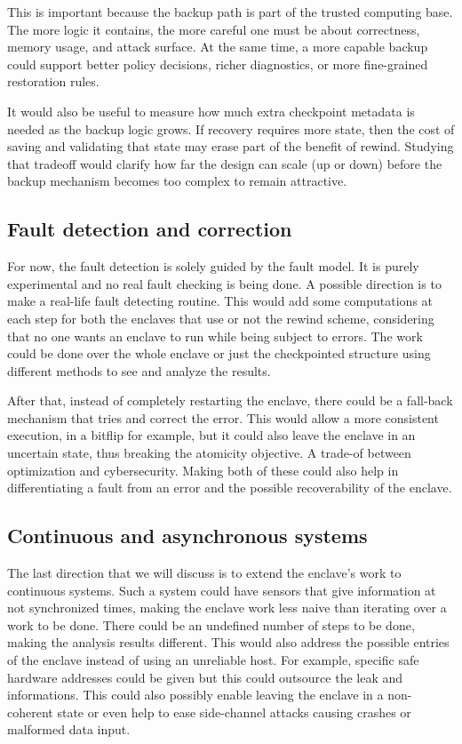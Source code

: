 \documentclass[11pt,a4paper]{report}
\begin{document}
This is important because the backup path is part of the trusted computing base. 
The more logic it contains, the more careful one must be about correctness, memory usage, and attack surface. 
At the same time, a more capable backup could support better policy decisions, richer diagnostics, or more fine-grained restoration rules.

It would also be useful to measure how much extra checkpoint metadata is needed as the backup logic grows. 
If recovery requires more state, then the cost of saving and validating that state may erase part of the benefit of rewind. 
Studying that tradeoff would clarify how far the design can scale (up or down) before the backup mechanism becomes too complex to remain attractive.

\subsection{Fault detection and correction}
For now, the fault detection is solely guided by the fault model. It is purely experimental and no real fault checking is being done.
A possible direction is to make a real-life fault detecting routine. 
This would add some computations at each step for both the enclaves that use or not the rewind scheme, considering that no one wants an enclave to run while being subject to errors.
The work could be done over the whole enclave or just the checkpointed structure using different methods to see and analyze the results. 

After that, instead of completely restarting the enclave, there could be a fall-back mechanism that tries and correct the error.
This would allow a more consistent execution, in a bitflip for example, but it could also leave the enclave in an uncertain state, thus breaking the atomicity objective.
A trade-of between optimization and cybersecurity. 
Making both of these could also help in differentiating a fault from an error and the possible recoverability of the enclave.

\subsection{Continuous and asynchronous systems}
The last direction that we will discuss is to extend the enclave's work to continuous systems. 
Such a system could have sensors that give information at not synchronized times, making the enclave work less naive than iterating over a work to be done.
There could be an undefined number of steps to be done, making the analysis results different.
This would also address the possible entries of the enclave instead of using an unreliable host.
For example, specific safe hardware addresses could be given but this could outsource the leak and informations.
This could also possibly enable leaving the enclave in a non-coherent state or even help to ease side-channel attacks causing crashes or malformed data input.
\end{document}
